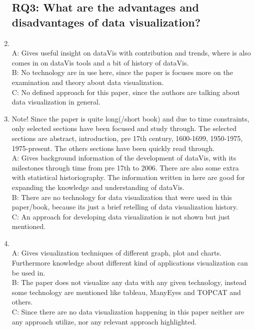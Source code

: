 \documentclass{article}
\begin{document}
\begin{enumerate}
\subsection{RQ3: What are the advantages and disadvantages of data visualization?}
	\item  \cite{aparicio2015data}  
		\\A: Gives useful insight on dataVis with contribution and trends, where is also comes in on dataVis tools and a bit of history of dataVis.
		\\B: No technology are in use here, since the paper is focuses more on the examination and theory about data visualization.
		\\C: No defined approach for this paper, since the authors are talking about data visualization in general.
	\item  \cite{friendly2008brief} Note! Since the paper is quite long(/short book) and due to time constraints, only selected sections have been focused and study through. The selected sections are abstract, introduction, pre 17th century, 1600-1699, 1950-1975, 1975-present. The others sections have been quickly read through.
		\\A: Gives background information of the development of dataVis, with its milestones through time from pre 17th to 2006. There are also some extra with statistical historiography. The information written in here are good for expanding the knowledge and understanding of dataVis.
		\\B: There are no technology for data visualization that were used in this paper/book, because its just a brief retelling of data visualization history.
		\\C: An approach for developing data visualization is not shown but just mentioned.  
	\item \cite{sadiku2016data}
		\\A: Gives visualization techniques of different graph, plot and charts. Furthermore knowledge about different kind of applications visualization can be used in.
		\\B: The paper does not visualize any data with any given technology, instead some technology are mentioned like tableau, ManyEyes and TOPCAT and others.  
		\\C: Since there are no data visualization happening in this paper neither are any approach utilize, nor any relevant approach highlighted.
		
\end{enumerate}		
	
\end{document}
